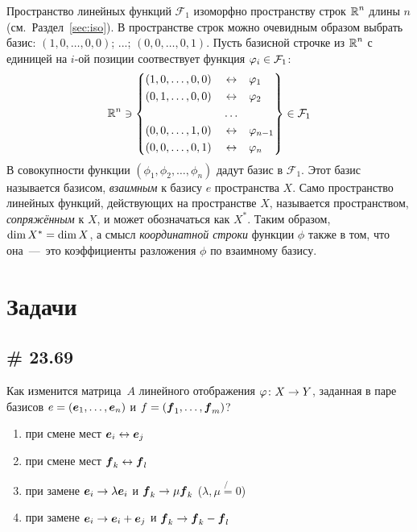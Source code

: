 \documentclass[a4paper,12pt]{article}
\begin{document}
  Пространство линейных функций $\mathcal F_1$ изоморфно пространству строк $\operatorname{\mathbb R}^n$ длины $n$ (см.~Раздел~\ref{sec:iso}).
  В пространстве строк можно очевидным образом выбрать базис: $(1, 0, \ldots, 0, 0)$; ...; $(0, 0, \ldots, 0, 1)$.
  Пусть базисной строчке из $\operatorname{\mathbb R}^n$ с единицей на $i$-ой позиции соотвествует функция $\phi_i \hm\in \mathcal F_1$:
  \[
    \RR^n \ni \left\{
      \begin{aligned}
        &(1, 0, \ldots, 0, 0)            & &\leftrightarrow & &\phi_{1\hphantom{-1}}\\
        &(0, 1, \ldots, 0, 0)            & &\leftrightarrow & &\phi_{2\hphantom{-1}}\\
        &\hphantom{(0, 1, \ldots, 0, 0)} & &\ldots  & &\hphantom{\phi_{2\hphantom{-1}}}\\
        &(0, 0, \ldots, 1, 0)            & &\leftrightarrow & &\phi_{n-1}\\
        &(0, 0, \ldots, 0, 1)            & &\leftrightarrow & &\phi_{n\hphantom{-1}}
      \end{aligned}
    \right\} \in \mathcal F_1
  \]
  В совокупности функции $(\phi_1, \phi_2, \ldots, \phi_n)$ дадут базис в $\mathcal F_1$.
  Этот базис называется базисом, \emph{взаимным} к базису $e$ пространства $X$.
  Само пространство линейных функций, действующих на пространстве $X$, называется пространством, \emph{сопряжённым} к $X$, и может обозначаться как $X^{*}$.
  Таким образом, $\dim X^{*} \hm= \dim X$, а смысл \emph{координатной строки} функции $\phi$ также в том, что она~---~это коэффициенты разложения $\phi$ по взаимному базису.
  
  
  \section{Задачи}
  
  \subsection{\# 23.69}
  
  Как изменится матрица~$A$ линейного отображения $\phi\colon X \hm\to Y$, заданная в паре базисов $e \hm= (\bds e_1, \ldots, \bds e_n)$ и $f \hm= (\bds f_1, \ldots, \bds f_m)$?
  \begin{enumerate}
    \item при смене мест $\boldsymbol e_i \leftrightarrow \boldsymbol e_j$
    \item при смене мест $\boldsymbol f_k \leftrightarrow \boldsymbol f_l$
    \item при замене $\boldsymbol e_i \to \lambda \boldsymbol e_i$ и $\boldsymbol f_k \to \mu \boldsymbol f_k$ ($\lambda, \mu \not{=} 0$)
    \item при замене $\boldsymbol e_i \to \boldsymbol e_i + \boldsymbol e_j$ и $\boldsymbol f_k \to \boldsymbol f_k - \boldsymbol f_l$
  \end{enumerate}
  
\end{document}
